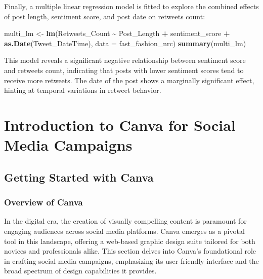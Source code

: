 \documentclass[
]{book}
\newenvironment{Shaded}{\begin{snugshade}}{\end{snugshade}}
\newcommand{\AttributeTok}[1]{\textcolor[rgb]{0.13,0.29,0.53}{#1}}
\newcommand{\FunctionTok}[1]{\textcolor[rgb]{0.13,0.29,0.53}{\textbf{#1}}}
\newcommand{\NormalTok}[1]{#1}
\newcommand{\OtherTok}[1]{\textcolor[rgb]{0.56,0.35,0.01}{#1}}
\newcommand{\SpecialCharTok}[1]{\textcolor[rgb]{0.81,0.36,0.00}{\textbf{#1}}}
\begin{document}
Finally, a multiple linear regression model is fitted to explore the combined effects of post length, sentiment score, and post date on retweets count:

\begin{Shaded}
\begin{Highlighting}[]
\NormalTok{multi\_lm }\OtherTok{\textless{}{-}} \FunctionTok{lm}\NormalTok{(Retweets\_Count }\SpecialCharTok{\textasciitilde{}}\NormalTok{ Post\_Length }\SpecialCharTok{+}\NormalTok{ sentiment\_score }\SpecialCharTok{+} \FunctionTok{as.Date}\NormalTok{(Tweet\_DateTime), }\AttributeTok{data =}\NormalTok{ fast\_fashion\_nrc)}
\FunctionTok{summary}\NormalTok{(multi\_lm)}
\end{Highlighting}
\end{Shaded}

This model reveals a significant negative relationship between sentiment score and retweets count, indicating that posts with lower sentiment scores tend to receive more retweets. The date of the post shows a marginally significant effect, hinting at temporal variations in retweet behavior.

\hypertarget{introduction-to-canva-for-social-media-campaigns}{%
\chapter{Introduction to Canva for Social Media Campaigns}\label{introduction-to-canva-for-social-media-campaigns}}

\hypertarget{getting-started-with-canva}{%
\section{Getting Started with Canva}\label{getting-started-with-canva}}

\hypertarget{overview-of-canva}{%
\subsection*{Overview of Canva}\label{overview-of-canva}}

In the digital era, the creation of visually compelling content is paramount for engaging audiences across social media platforms. Canva emerges as a pivotal tool in this landscape, offering a web-based graphic design suite tailored for both novices and professionals alike. This section delves into Canva's foundational role in crafting social media campaigns, emphasizing its user-friendly interface and the broad spectrum of design capabilities it provides.
\end{document}

